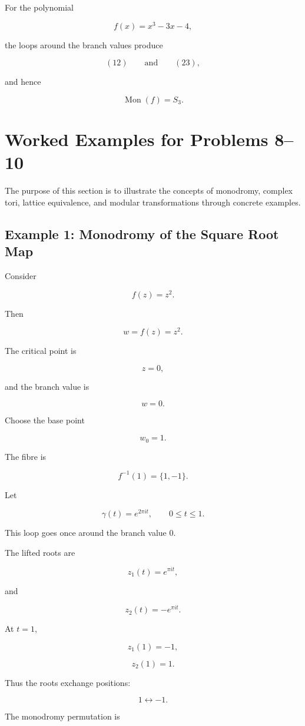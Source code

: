 \documentclass[12pt,a4paper]{article}
\theoremstyle{notespace}
\begin{document}
For the polynomial

\[
f(x)=x^3-3x-4,
\]

the loops around the branch values produce

\[
(12)
\qquad\text{and}\qquad
(23),
\]

and hence

\[
\boxed{
	\operatorname{Mon}(f)
	=
	S_3.
}
\]

\section{Worked Examples for Problems 8--10}

The purpose of this section is to illustrate the concepts of monodromy,
complex tori, lattice equivalence, and modular transformations through
concrete examples.

\subsection{Example 1: Monodromy of the Square Root Map}

Consider

\[
f(z)=z^2.
\]

Then

\[
w=f(z)=z^2.
\]

The critical point is

\[
z=0,
\]

and the branch value is

\[
w=0.
\]

Choose the base point

\[
w_0=1.
\]

The fibre is

\[
f^{-1}(1)=\{1,-1\}.
\]

Let

\[
\gamma(t)=e^{2\pi it},
\qquad
0\le t\le1.
\]

This loop goes once around the branch value \(0\).

The lifted roots are

\[
z_1(t)=e^{\pi it},
\]

and

\[
z_2(t)=-e^{\pi it}.
\]

At \(t=1\),

\[
z_1(1)=-1,
\]

\[
z_2(1)=1.
\]

Thus the roots exchange positions:

\[
1
\leftrightarrow
-1.
\]

The monodromy permutation is
\end{document}
